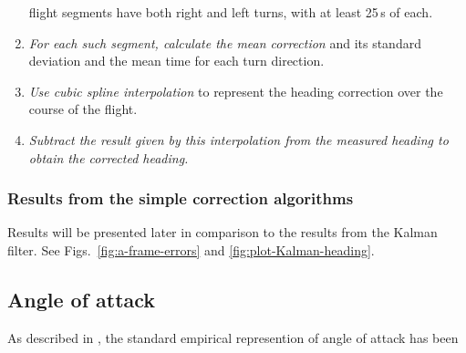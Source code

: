 \documentclass[12pt,twoside,english,12pt,twoside,english]{article}\usepackage[]{graphicx}\usepackage[]{color}
\let\OrgIndex\index
\renewcommand*{\index}[1]{\OrgIndex{#1}}
\begin{document}
\begin{enumerate}
flight segments have
both right and left turns, with at least 25\,s of each.
\item \emph{For each such segment, calculate the mean correction} and its
standard deviation
and the mean time for each turn direction.
\item \emph{Use cubic spline interpolation} to represent the heading correction
over the course of the flight. 
\item \emph{Subtract the result given by this interpolation from the measured
heading to obtain the corrected heading.}
\end{enumerate}

\subsubsection{Results from the simple correction algorithms}

Results will be presented later in comparison to the results from
the Kalman filter. See Figs.~\ref{fig:a-frame-errors} and \ref{fig:plot-Kalman-heading}. 

\subsection{Angle of attack}

As described in \citet{Cooper2016ncartn}, the standard empirical
represention of angle of attack
has been
\end{document}
